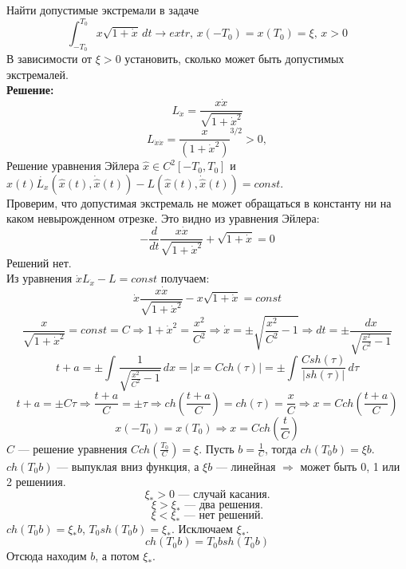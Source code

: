 \begin{task}
    Найти допустимые экстремали в задаче
    \[  \int_{-T_{0}}^{T_{0}} x\sqrt{1 + \dot{x}} \,dt \rightarrow extr\text{, }x(-T_{0}) = x(T_{0}) = \xi\text{, } x > 0 \]
    В зависимости от $\xi > 0$ установить, сколько может быть допустимых экстремалей. \\
    \textbf{Решение:} \\
    \[L_{\dot{x}} = \frac{x\dot{x}}{\sqrt{1 + \dot{x}^2}}\]
    \[L_{\dot{x}\dot{x}} = {\frac{x}{(1 + \dot{x}^{2})}^ {3/2}} > 0,\]
    Решение уравнения Эйлера $\hat{x} \in C^2[-T_{0}, T_{0}]$ и $\hat{x}(t)\dot{L_{x}}(\hat{x}(t),
        \dot{\hat{x}}(t)) - L(\hat{x}(t),
        \dot{\hat{x}}(t)) = const$.\\
    Проверим, что допустимая экстремаль не может обращаться в константу ни на каком невырожденном отрезке. Это видно из уравнения Эйлера:
    \[-\frac{d}{dt} \frac{x\dot{x}}{\sqrt{1 + \dot{x}^2}} + \sqrt{1 + \dot{x}} = 0\]
    Решений нет. \\
    Из уравнения $\dot{x}L_{\dot{x}} - L = const$ получаем: \\
    \[ \dot{x} \frac{x\dot{x}}{\sqrt{1 + \dot{x}^2}} - x\sqrt{1 + \dot{x}} = const\]
    \[\frac{x}{\sqrt{1 + \dot{x}^2}} = const = C \Rightarrow 1 + \dot{x}^2 = \frac{x^2}{C^2} \Rightarrow \dot{x} = \pm \sqrt{\frac{x^2}{C^2} - 1} \Rightarrow dt = \pm \frac{dx}{\sqrt{\frac{x^2}{C^2} - 1}}\]
    \[t + a = \pm \int_{}^{}\frac{1}{\sqrt{\frac{x^2}{C^2} - 1}} \,dx = \left| x = Cch(\tau) \right| = \pm \int_{}^{}\frac{C sh(\tau)}{|sh(\tau)|} \,d\tau \]
    \[t + a = \pm C\tau \Rightarrow \frac{t+a}{C} = \pm \tau \Rightarrow ch\left(\frac{t+a}{C}\right) = ch(\tau) = \frac{x}{C} \Rightarrow x = Cch\left(\frac{t+a}{C}\right)\]
    \[x(-T_{0}) = x(T_{0}) \Rightarrow x = Cch\left(\frac{t}{C}\right)\]
    $C$ --- решение уравнения $Cch\left(\frac{T_{0}}{C}\right) = \xi$. Пусть $b = \frac{1}{C}$, тогда $ch(T_{0}b) = \xi b$. $ch(T_{0}b)$ --- выпуклая вниз функция, а $\xi b$ --- линейная $\Rightarrow$ может быть 0, 1 или 2 решениия.
    \[\xi_{*} > 0 \text{ --- случай касания.}\]
    \[\xi > \xi_{*} \text{ --- два решения.}\]
    \[\xi < \xi_{*} \text{ --- нет решений.}\]
    $ch(T_{0}b) = \xi_{*}b$, $T_{0}sh(T_{0}b) = \xi_{*}$. Исключаем $\xi_{*}$.
    \[ch(T_{0}b) = T_{0}bsh(T_{0}b)\]
    Отсюда находим $b$, а потом $\xi_{*}$.
\end{task}